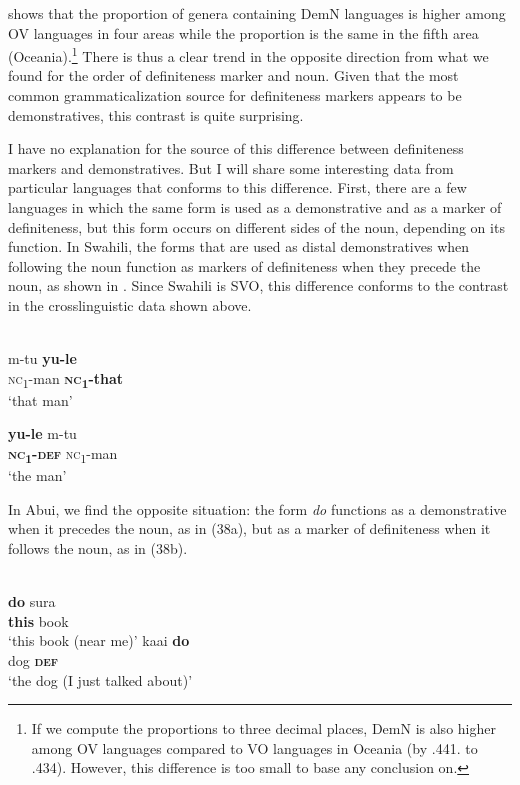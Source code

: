 \documentclass[output=paper]{langsci/langscibook}
\begin{document}
 shows that the proportion of genera containing DemN languages is higher among OV languages in four areas while the proportion is the same in the fifth area (Oceania).\footnote{If we compute the proportions to three decimal places, DemN is also higher among OV languages compared to VO languages in Oceania (by .441. to .434). However, this difference is too small to base any conclusion on.} There is thus a clear trend in the opposite direction from what we found for the order of definiteness marker and noun. Given that the most common grammaticalization source for definiteness markers appears to be demonstratives, this contrast is quite surprising.

I have no explanation for the source of this difference between definiteness markers and demonstratives. But I will share some interesting data from particular languages that conforms to this difference. First, there are a few languages in which the same form is used as a demonstrative and as a marker of definiteness, but this form occurs on different sides of the noun, depending on its function. In Swahili, the forms that are used as distal demonstratives when following the noun function as markers of definiteness when they precede the noun, as shown in . Since Swahili is SVO, this difference conforms to the contrast in the crosslinguistic data shown above.

\ea
{}\\
\ea \gll  m-tu  \textbf{yu-le}\\
         \textsc{nc}\textsubscript{1}{}-man  \textbf{\textsc{nc}}\textbf{\textsubscript{1}}\textbf{{}-that}\\
\glt     ‘that man’

\ex
\gll    \textbf{yu-le}  m-tu\\
         \textbf{\textsc{nc}}\textbf{\textsubscript{1}}\textbf{{}-}\textbf{\textsc{def}}  \textsc{nc}\textsubscript{1}{}-man\\
\glt     ‘the man’
\z
\z

In Abui, we find the opposite situation: the form \textit{do} functions as a demonstrative when it precedes the noun, as in (38a), but as a marker of definiteness when it follows the noun, as in (38b).

\ea\label{ex:dryer:}
\\
\ea
\gll     \textbf{do}  sura  \\  
         \textbf{this}  book\\    
\glt     ‘this book (near me)’  
\ex  kaai  \textbf{do}\\
    dog  \textbf{\textsc{def}}\\
  ‘the dog (I just talked about)’
\z
\z
\end{document}
